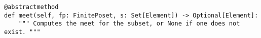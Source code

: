 \par\begin{minipage}{76ex}
\begin{verbatim}
@abstractmethod
def meet(self, fp: FinitePoset, s: Set[Element]) -> Optional[Element]:
    """ Computes the meet for the subset, or None if one does not exist. """
\end{verbatim}
\end{minipage}\par